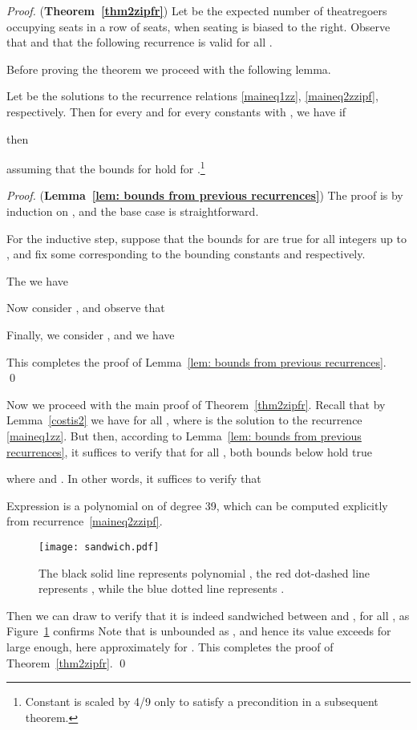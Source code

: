 \documentclass[11pt]{llncs}
\begin{document}
\begin{proof} ({\bf Theorem~\ref{thm2zipfr}})
Let  be the expected number of theatregoers occupying seats 
in a row of  seats,
when seating is biased to the right.
Observe that  and that the following recurrence is valid
for all .

Before proving the theorem we proceed with the following lemma.

\begin{lemma}\label{lem: bounds from previous recurrences}
Let  be the solutions to the recurrence relations \eqref{maineq1zz}, \eqref{maineq2zzipf},  respectively. Then for every  and for every constants  with , we have if 

then

assuming that the bounds for  hold for .\footnote{Constant  is scaled by 4/9 only to satisfy a precondition in a subsequent theorem.}
\end{lemma}

\begin{proof} ({\bf Lemma~\ref{lem: bounds from previous recurrences}})
The proof is by induction on , and the base case  is straightforward. 

For the inductive step, suppose that the bounds for  are true for all integers up to , and fix some  corresponding to the bounding constants  and  respectively. 

The we have


Now consider , and observe that 


Finally, we consider , and we have 

This completes the proof of Lemma~\ref{lem: bounds from previous recurrences}.
\qed
\end{proof}


Now we proceed with the main proof of Theorem~\ref{thm2zipfr}.
Recall that by Lemma~\ref{costis2} we have  for all , where  is the solution to the recurrence \eqref{maineq1zz}. But then, according to Lemma~\eqref{lem: bounds from previous recurrences}, it suffices to verify that for all , both bounds below hold true

where  and . In other words, it suffices to verify that 

Expression  is a polynomial on  of degree 39, which can be computed explicitly from recurrence~\eqref{maineq2zzipf}. 

\begin{figure}[!htb]
\begin{center}
\texttt{[image: sandwich.pdf]}\caption{The black solid line represents polynomial , the red dot-dashed line represents , while the blue dotted line represents .}
\label{fig: sandwich R40}
\end{center}
\end{figure}
Then we can draw  to verify that it is indeed sandwiched between  and , for all , as Figure~\ref{fig: sandwich R40} confirms 
Note that  is unbounded as , and hence its value exceeds  for  large enough, here approximately for .
This completes the proof of Theorem~\ref{thm2zipfr}. \qed
\end{proof}
\end{document}
